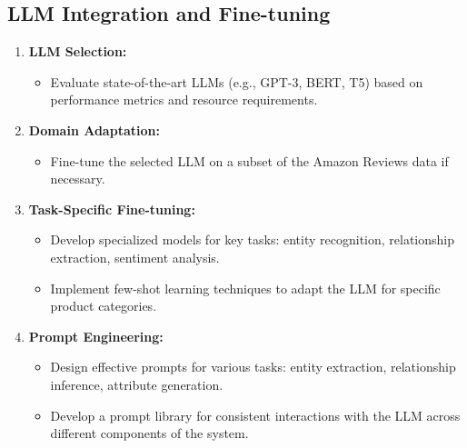 \documentclass{article}
\begin{document}
\subsection{LLM Integration and Fine-tuning}
\begin{enumerate}
    \item \textbf{LLM Selection:}
    \begin{itemize}
        \item Evaluate state-of-the-art LLMs (e.g., GPT-3, BERT, T5) based on performance metrics and resource requirements.
    \end{itemize}
    
    \item \textbf{Domain Adaptation:}
    \begin{itemize}
        \item Fine-tune the selected LLM on a subset of the Amazon Reviews data if necessary.
    \end{itemize}
    
    \item \textbf{Task-Specific Fine-tuning:}
    \begin{itemize}
        \item Develop specialized models for key tasks: entity recognition, relationship extraction, sentiment analysis.
        \item Implement few-shot learning techniques to adapt the LLM for specific product categories.
    \end{itemize}
    
    \item \textbf{Prompt Engineering:}
    \begin{itemize}
        \item Design effective prompts for various tasks: entity extraction, relationship inference, attribute generation.
        \item Develop a prompt library for consistent interactions with the LLM across different components of the system.
    \end{itemize}
\end{enumerate}
\end{document}
